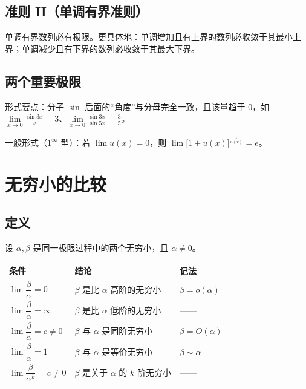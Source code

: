 \subsection{准则 II（单调有界准则）}
单调有界数列必有极限。更具体地：单调增加且有上界的数列必收敛于其最小上界；单调减少且有下界的数列必收敛于其最大下界。


\subsection{两个重要极限}
\noindent 形式要点：分子 $\sin$ 后面的“角度”与分母完全一致，且该量趋于 0，如 $\lim\limits_{x\to0}\frac{\sin3x}{x}=3$、$\lim\limits_{x\to0}\frac{\sin 3x}{\sin 5x}=\frac35$。

\noindent 一般形式（$1^{\infty}$ 型）：若 $\lim u(x)=0$，则 $\lim\bigl[1+u(x)\bigr]^{\frac{1}{u(x)}}=e$。


\section{无穷小的比较}

\subsection{定义}
设 $\alpha,\beta$ 是同一极限过程中的两个无穷小，且 $\alpha\neq0$。
\begin{center}
\begin{tabular}{@{}lll@{}}
\toprule
条件 & 结论 & 记法 \\
\midrule
$\lim\dfrac{\beta}{\alpha}=0$ & $\beta$ 是比 $\alpha$ 高阶的无穷小 & $\beta=o(\alpha)$ \\
$\lim\dfrac{\beta}{\alpha}=\infty$ & $\beta$ 是比 $\alpha$ 低阶的无穷小 & —— \\
$\lim\dfrac{\beta}{\alpha}=c\neq0$ & $\beta$ 与 $\alpha$ 是同阶无穷小 & $\beta=O(\alpha)$ \\
$\lim\dfrac{\beta}{\alpha}=1$ & $\beta$ 与 $\alpha$ 是等价无穷小 & $\beta\sim\alpha$ \\
$\lim\dfrac{\beta}{\alpha^k}=c\neq0$ & $\beta$ 是关于 $\alpha$ 的 $k$ 阶无穷小 & —— \\
\bottomrule
\end{tabular}
\end{center}

